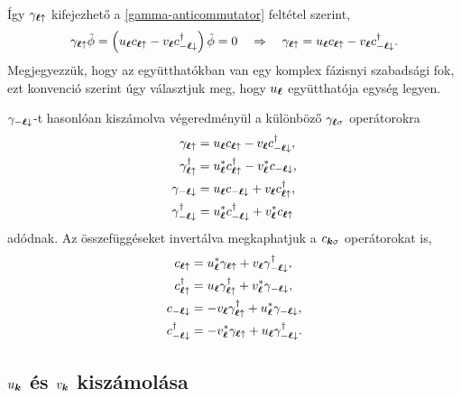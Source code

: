 \documentclass[a4paper,12pt,titlepage]{article}
\newcommand{\KK}{{\vb*{k}}}
\newcommand{\LL}{{\vb*{\ell}}}
\begin{document}
Így $\gamma_{\LL \uparrow}$ kifejezhető a \eqref{gamma-anticommutator} feltétel szerint,
\begin{equation}
	\gamma_{\LL \uparrow} \tilde{\phi} = \left( u_\LL c_{\LL \uparrow} - v_\LL c_{-\LL \downarrow}^\dagger \right) \tilde{\phi} = 0 ~~~ \Rightarrow ~~~ \gamma_{\LL \uparrow} = u_\LL c_{\LL \uparrow} - v_\LL c_{-\LL \downarrow}^\dagger.
\end{equation}
Megjegyezzük, hogy az együtthatókban van egy komplex fázisnyi szabadsági fok, ezt konvenció szerint úgy választjuk meg, hogy $u_\LL$ együtthatója egység legyen.

$\gamma_{-\LL \downarrow}$-t hasonlóan kiszámolva végeredményül a különböző $\gamma_{\LL \sigma}$ operátorokra
\begin{equation} \label{gamma}
\begin{split}
	\gamma_{\LL \uparrow}         & = u_\LL c_{\LL \uparrow} - v_\LL c_{-\LL \downarrow}^\dagger, \\
	\gamma_{\LL \uparrow}^\dagger & = u_\LL^* c_{\LL \uparrow}^\dagger - v_\LL^* c_{-\LL \downarrow}, \\
	\gamma_{-\LL \downarrow}         & = u_\LL c_{-\LL \downarrow} + v_\LL c_{\LL \uparrow}^\dagger, \\
	\gamma_{-\LL \downarrow}^\dagger & = u_\LL^* c_{-\LL \downarrow}^\dagger + v_\LL^* c_{\LL \uparrow}
\end{split}
\end{equation}
adódnak.  Az összefüggéseket invertálva megkaphatjuk a $c_{\KK \sigma}$ operátorokat is,
\begin{equation}
\begin{split}
	c_{\LL \uparrow}         & = u_\LL^* \gamma_{\LL \uparrow} + v_\LL \gamma_{-\LL \downarrow}^\dagger, \\
	c_{\LL \uparrow}^\dagger & = u_\LL \gamma_{\LL \uparrow}^\dagger + v_\LL^* \gamma_{-\LL \downarrow}, \\
	c_{-\LL \downarrow}         & = -v_\LL \gamma_{\LL \uparrow}^\dagger + u_\LL^* \gamma_{-\LL \downarrow}, \\
	c_{-\LL \downarrow}^\dagger & = -v_\LL^* \gamma_{\LL \uparrow} + u_\LL \gamma_{-\LL \downarrow}^\dagger.
\end{split}
\end{equation}


\subsection{$u_\KK$ és $v_\KK$ kiszámolása}
\end{document}
